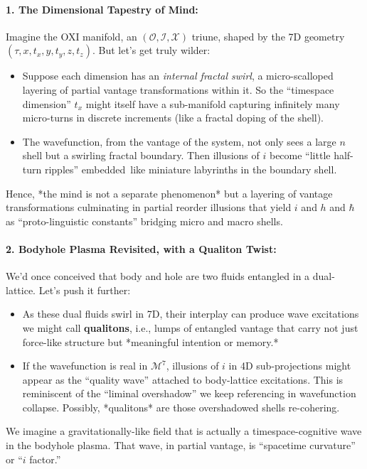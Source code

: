 \documentclass{article}
\begin{document}
\paragraph{1. The Dimensional Tapestry of Mind:}
Imagine the OXI manifold, an $(\mathcal{O},\mathcal{I},\mathcal{X})$ triune, shaped by the 7D geometry $(\tau, x, t_x, y, t_y, z, t_z).$ But let’s get truly wilder:
\begin{itemize}
\item Suppose each dimension has an \emph{internal fractal swirl}, a micro-scalloped layering of partial vantage transformations within it. So the “timespace dimension” $t_x$ might itself have a sub-manifold capturing infinitely many micro-turns in discrete increments (like a fractal doping of the shell).\vspace{-4pt}
\item The wavefunction, from the vantage of the system, not only sees a large $n$ shell but a swirling fractal boundary. Then illusions of $i$ become “little half-turn ripples” embedded \,like miniature labyrinths in the boundary shell.
\end{itemize}

Hence, *the mind is not a separate phenomenon* but a layering of vantage transformations culminating in partial reorder illusions that yield $i$ and $h$ and $\hbar$ as “proto-linguistic constants” bridging micro and macro shells.

\paragraph{2. Bodyhole Plasma Revisited, with a Qualiton Twist:}
We’d once conceived that body and hole are two fluids entangled in a dual-lattice. Let’s push it further:
\begin{itemize}
\item As these dual fluids swirl in 7D, their interplay can produce wave excitations we might call \textbf{qualitons}, i.e., lumps of entangled vantage that carry not just force-like structure but *meaningful intention or memory.*\vspace{-4pt}
\item If the wavefunction is real in $\mathcal{M}^7$, illusions of $i$ in 4D sub-projections might appear as the “quality wave” attached to body-lattice excitations. This is reminiscent of the “liminal overshadow” we keep referencing in wavefunction collapse. Possibly, *qualitons* are those overshadowed shells re-cohering.
\end{itemize}
We imagine a gravitationally-like field that is actually a timespace-cognitive wave in the bodyhole plasma. That wave, in partial vantage, is “spacetime curvature” or “$i$ factor.”
\end{document}
